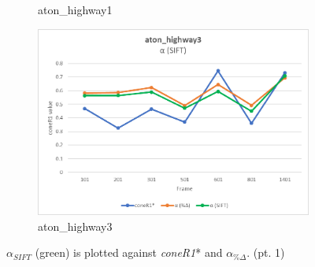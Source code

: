 \begin{appendices}
\begin{figure}
\begin{subfigure}{.45\linewidth}
  \caption{aton\_highway1}
\end{subfigure}
\hfill
\begin{subfigure}{.45\linewidth}
  \includegraphics[width=1\linewidth]{figures/appendix/highway3_sift.jpg}
  \caption{aton\_highway3}
\end{subfigure}

\caption{$\alpha_{SIFT}$ (green) is plotted against \textit{coneR1}* and $\alpha_{\%\Delta}$. (pt. 1)}
\end{figure}


\end{appendices}
